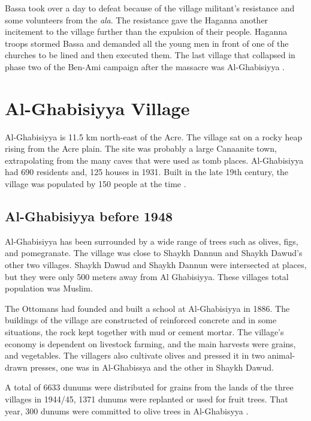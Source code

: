 Bassa took over a day to defeat because of the village militant's resistance and some volunteers from the \textit{\acrfull{ala}}. The resistance gave the Haganna another incitement to  the village further than the expulsion of their people. Haganna troops stormed Bassa and demanded all the young men in front of one of the churches to be lined and then executed them. The last village that collapsed in phase two of the Ben-Ami campaign after the massacre was Al-Ghabisiyya \citep{Morris2004, Pappe2006}.  



\section{Al-Ghabisiyya Village}

Al-Ghabisiyya is 11.5 km north-east of the Acre. The village sat on a rocky heap rising from the Acre plain. The site was probably a large Canaanite town, extrapolating from the many caves that were used as tomb places.
Al-Ghabisiyya had 690 residents and, 125 houses in 1931. Built in the late 19th century, the village was populated by 150 people at the time \citep{Khalidi2015}.
\subsection{Al-Ghabisiyya before 1948}

 Al-Ghabisiyya has been surrounded by a wide range of trees such as olives, figs, and pomegranate. The village was close to Shaykh Dannun and Shaykh Dawud's other two villages. Shaykh Dawud and Shaykh Dannun were intersected at places, but they were only 500 meters away from Al Ghabisiyya. These villages total population was Muslim. 

The Ottomans had founded and built a school at Al-Ghabisiyya in 1886. The buildings of the village are constructed of reinforced concrete and in some situations, the rock kept together with mud or cement mortar. The village's economy is dependent on livestock farming, and the main harvests were grains, and vegetables. The villagers also cultivate olives and pressed it in two animal-drawn presses, one was in Al-Ghabissya and the other in Shaykh Dawud.

A total of 6633 dunums were distributed for grains from the lands of the three villages in 1944/45, 1371 dunums were replanted or used for fruit trees. That year, 300 dunums were committed to olive trees in Al-Ghabisyya \citep{Khalidi2015}.

